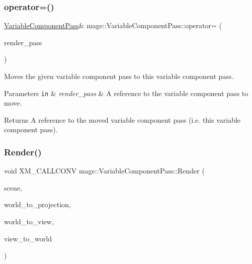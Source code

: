 \subsubsection{\texorpdfstring{operator=()}{operator=()}\hspace{0.1cm}{\footnotesize\ttfamily [2/2]}}
{\footnotesize\ttfamily \hyperlink{classmage_1_1_variable_component_pass}{Variable\+Component\+Pass}\& mage\+::\+Variable\+Component\+Pass\+::operator= (\begin{DoxyParamCaption}\item[{\hyperlink{classmage_1_1_variable_component_pass}{Variable\+Component\+Pass} \&\&}]{render\+\_\+pass }\end{DoxyParamCaption})\hspace{0.3cm}{\ttfamily [delete]}}

Moves the given variable component pass to this variable component pass.


\begin{DoxyParams}[1]{Parameters}
\mbox{\tt in}  & {\em render\+\_\+pass} & A reference to the variable component pass to move. \\
\hline
\end{DoxyParams}
\begin{DoxyReturn}{Returns}
A reference to the moved variable component pass (i.\+e. this variable component pass). 
\end{DoxyReturn}
\hypertarget{classmage_1_1_variable_component_pass_a343fd1c240fb8b32c512466aeffe73d7}{}\label{classmage_1_1_variable_component_pass_a343fd1c240fb8b32c512466aeffe73d7} 
\subsubsection{\texorpdfstring{Render()}{Render()}}
{\footnotesize\ttfamily void X\+M\+\_\+\+C\+A\+L\+L\+C\+O\+NV mage\+::\+Variable\+Component\+Pass\+::\+Render (\begin{DoxyParamCaption}\item[{const \hyperlink{classmage_1_1_scene}{Scene} \&}]{scene,  }\item[{F\+X\+M\+M\+A\+T\+R\+IX}]{world\+\_\+to\+\_\+projection,  }\item[{C\+X\+M\+M\+A\+T\+R\+IX}]{world\+\_\+to\+\_\+view,  }\item[{C\+X\+M\+M\+A\+T\+R\+IX}]{view\+\_\+to\+\_\+world }\end{DoxyParamCaption})}

